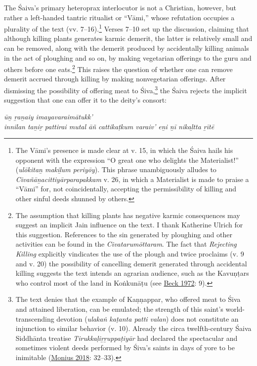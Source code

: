 The Śaiva’s primary heteroprax interlocutor is not a Christian, however, but rather a left-handed tantric ritualist or “Vāmi,” whose refutation occupies a plurality of the text (vv. 7–16).\footnote{%
The Vāmi’s presence is made clear at v. 15, in which the Śaiva hails his opponent with the expression “O great one who delights the Materialist!” (\emph{ulōkitaṉ makiḻum periyōy}). This phrase unambiguously alludes to \emph{{Civañāṉacittiyār}}\emph{parapakkam} v. 26, in which a Materialist is made to praise a “Vāmi” for, not coincidentally, accepting the permissibility of killing and other sinful deeds shunned by others.
}
 Verses 7–10 set up the discussion, claiming that although killing plants generates karmic demerit, the latter is relatively small and can be removed, along with the demerit produced by accidentally killing animals in the act of ploughing and so on, by making vegetarian offerings to the guru and others before one eats.\footnote{%
The assumption that killing plants has negative karmic consequences may suggest an implicit Jain influence on the text. I thank Katherine Ulrich for this suggestion. References to the sin generated by ploughing and other activities can be found in the \emph{{Civatarumōttaram}}. The fact that \emph{Rejecting Killing} explicitly vindicates the use of the plough and twice proclaims (v. 9 and v. 20) the possibility of cancelling demerit generated through accidental killing suggests the text intends an agrarian audience, such as the Kavuṇṭars who control most of the land in Koṅkunāṭu (see \hyperref[Beck1972]{Beck 1972}: 9).
}
 This raises the question of whether one can remove demerit accrued through killing by making nonvegetarian offerings. After dismissing the possibility of offering meat to Śiva,\footnote{%
The text denies that the example of Kaṇṇappar, who offered meat to Śiva and attained liberation, can be emulated; the strength of this saint’s world-transcending devotion (\emph{ulakaṅ kaṭanta patti valan}) does not constitute an injunction to similar behavior (v. 10). Already the circa twelfth-century Śaiva Siddhānta treatise \emph{{Tirukkaḷiṟṟuppaṭiyār}} had declared the spectacular and sometimes violent deeds performed by Śiva’s saints in days of yore to be inimitable (\hyperref[Monius2018]{Monius 2018}: 32–33).
}
 the Śaiva rejects the implicit suggestion that one can offer it to the deity’s consort:

\begin{pullquote}\raggedright
      \emph{ūṉ ṟaṉaiy imayavaraimātukk’}\\
\emph{innilan taṉiṟ pattirai mutal āñ cattikaṭkum varaiv’ eṉi ṉī nikaḻtta ṟītē}
\end{pullquote}
      
